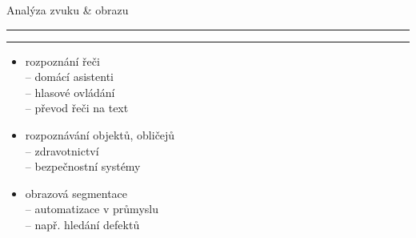 \documentclass[aspectratio=43]{beamer}
\def\vs{\vspace{-2mm}}
\def\lend{\phantom{g}\vspace{1.5mm}\hrule\hrule}
\begin{document}
\begin{frame}{\vs Analýza zvuku \& obrazu \lend}
\vspace{1mm}
\begin{itemize}
    \item<1-> rozpoznání řeči\\ \vspace{2mm}
        -- domácí asistenti\\ \vspace{2mm}
        -- hlasové ovládání\\ \vspace{2mm}
        -- převod řeči na text\\ \vspace{5.5mm}
    \item<2-> rozpoznávání objektů, obličejů\\ \vspace{2mm}
        -- zdravotnictví\\ \vspace{2mm}
        -- bezpečnostní systémy\\ \vspace{4.5mm}
    \item<3-> obrazová segmentace\\ \vspace{2mm}
        -- automatizace v průmyslu\\ \vspace{2mm}
        -- např. hledání defektů
\end{itemize}
\end{frame}
\end{document}
